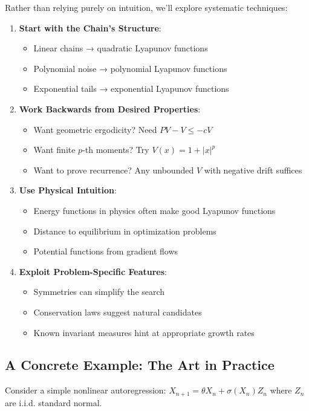 \documentclass{amsart}
\theoremstyle{plain}
\theoremstyle{definition}
\theoremstyle{remark}
\begin{document}
Rather than relying purely on intuition, we'll explore systematic techniques:

\begin{enumerate}
	\item \textbf{Start with the Chain's Structure}:
	\begin{itemize}
		\item Linear chains → quadratic Lyapunov functions
		\item Polynomial noise → polynomial Lyapunov functions
		\item Exponential tails → exponential Lyapunov functions
	\end{itemize}
	\item \textbf{Work Backwards from Desired Properties}:
	\begin{itemize}
		\item Want geometric ergodicity? Need $PV - V \leq -cV$
		\item Want finite $p$-th moments? Try $V(x) = 1 + |x|^p$
		\item Want to prove recurrence? Any unbounded $V$ with negative drift suffices
	\end{itemize}
	\item \textbf{Use Physical Intuition}:
	\begin{itemize}
		\item Energy functions in physics often make good Lyapunov functions
		\item Distance to equilibrium in optimization problems
		\item Potential functions from gradient flows
	\end{itemize}
	\item \textbf{Exploit Problem-Specific Features}:
	\begin{itemize}
		\item Symmetries can simplify the search
		\item Conservation laws suggest natural candidates
		\item Known invariant measures hint at appropriate growth rates
	\end{itemize}
\end{enumerate}

\subsection{A Concrete Example: The Art in Practice}

Consider a simple nonlinear autoregression: $X_{n+1} = \theta X_n + \sigma(X_n) Z_n$ where $Z_n$ are i.i.d. standard normal.
\end{document}

